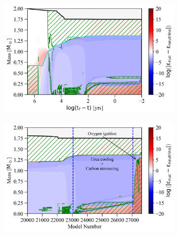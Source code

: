 \documentclass[main.tex]{subfiles}
\begin{document}
\begin{figure}[h!]
    \centering
    \begin{subfigure}{.5\textwidth}
        \centering
        \includegraphics[width=0.95\columnwidth]{figures/chapter2/kipp/series2_rt_2p0M_eta0p25.png}
    \end{subfigure}\hfill
    \begin{subfigure}{.5\textwidth}
        \centering
        \includegraphics[width=0.95\columnwidth]{figures/chapter2/kipp/vs_model_number/series2_mn_2p0M_eta0p25.png}
    \end{subfigure}\hfill
    

\end{figure}
\end{document}
